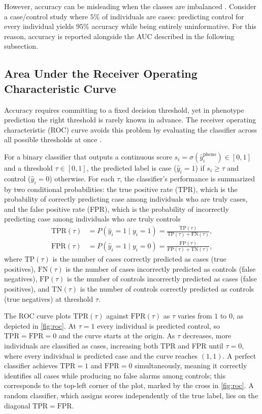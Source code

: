 However, accuracy can be misleading when the classes are imbalanced \citep{Fawcett2006}. Consider a case/control study where $5\%$ of individuals are cases: predicting control for every individual yields $95\%$ accuracy while being entirely uninformative. For this reason, accuracy is reported alongside the AUC described in the following subsection.

\subsection{Area Under the Receiver Operating Characteristic Curve}
\label{sec:auc}
Accuracy requires committing to a fixed decision threshold, yet in
phenotype prediction the right threshold is rarely known in advance. The
receiver operating characteristic (ROC) curve avoids this problem by
evaluating the classifier across all possible thresholds at once
\citep{Fawcett2006}.

For a binary classifier that outputs a continuous score
$s_i = \sigma(\hat{y}^{\mathrm{pheno}}_i) \in [0, 1]$ and a threshold
$\tau \in [0, 1]$, the predicted label is case ($\hat{y}_i = 1$) if
$s_i \geq \tau$ and control ($\hat{y}_i = 0$) otherwise. For each
$\tau$, the classifier's performance is summarized by two conditional
probabilities: the true positive rate (TPR), which is the probability of
correctly predicting case among individuals who are truly cases, and the
false positive rate (FPR), which is the probability of incorrectly
predicting case among individuals who are truly controls
\begin{align}
    \mathrm{TPR}(\tau)
    &= P(\hat{y}_i = 1 \mid y_i = 1)
    = \frac{\mathrm{TP}(\tau)}
           {\mathrm{TP}(\tau) + \mathrm{FN}(\tau)},
    \label{eq:tpr} \\[4pt]
    \mathrm{FPR}(\tau)
    &= P(\hat{y}_i = 1 \mid y_i = 0)
    = \frac{\mathrm{FP}(\tau)}
           {\mathrm{FP}(\tau) + \mathrm{TN}(\tau)},
    \label{eq:fpr}
\end{align}
where $\mathrm{TP}(\tau)$ is the number of cases correctly predicted as
cases (true positives), $\mathrm{FN}(\tau)$ is the number of cases
incorrectly predicted as controls (false negatives), $\mathrm{FP}(\tau)$
is the number of controls incorrectly predicted as cases (false positives),
and $\mathrm{TN}(\tau)$ is the number of controls correctly predicted as
controls (true negatives) at threshold $\tau$.

The ROC curve plots $\mathrm{TPR}(\tau)$ against $\mathrm{FPR}(\tau)$ as
$\tau$ varies from $1$ to $0$, as depicted in \autoref{fig:roc}. At
$\tau = 1$ every individual is predicted control, so
$\mathrm{TPR} = \mathrm{FPR} = 0$ and the curve starts at the origin. As
$\tau$ decreases, more individuals are classified as cases, increasing
both TPR and FPR until $\tau = 0$, where every individual is predicted
case and the curve reaches $(1, 1)$. A perfect classifier achieves
$\mathrm{TPR} = 1$ and $\mathrm{FPR} = 0$ simultaneously, meaning it
correctly identifies all cases while producing no false alarms among
controls; this corresponds to the top-left corner of the plot, marked by
the cross in \autoref{fig:roc}. A random classifier, which assigns scores
independently of the true label, lies on the diagonal
$\mathrm{TPR} = \mathrm{FPR}$.

